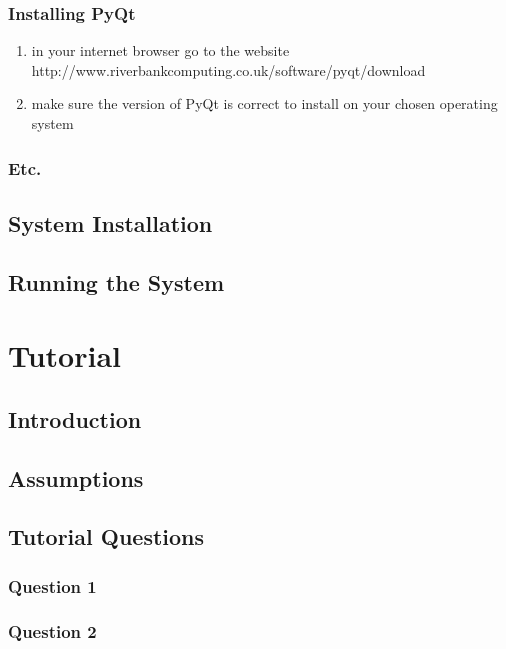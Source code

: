 \subsubsection{Installing PyQt}
\begin{enumerate}
\item in your internet browser go to the website\newline
http://www.riverbankcomputing.co.uk/software/pyqt/download
\item make sure the version of PyQt is correct to install on your chosen operating system 

\end{enumerate}
\subsubsection{Etc.}

\subsection{System Installation}

\subsection{Running the System}

\section{Tutorial}

\subsection{Introduction}

\subsection{Assumptions}

\subsection{Tutorial Questions}

\subsubsection{Question 1}

\subsubsection{Question 2}


